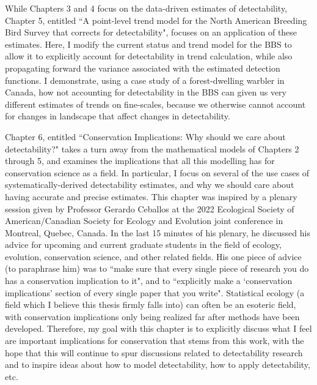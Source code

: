 \par While Chapters 3 and 4 focus on the data-driven estimates of detectability, Chapter 5, entitled ``A point-level trend model for the North American Breeding Bird Survey that corrects for detectability", focuses on an application of these estimates.
Here, I modify the current status and trend model for the BBS \citep{smith_spatially_2023} to allow it to explicitly account for detectability in trend calculation, while also propagating forward the variance associated with the estimated detection functions.
I demonstrate, using a case study of a forest-dwelling warbler in Canada, how not accounting for detectability in the BBS can given us very different estimates of trends on fine-scales, because we otherwise cannot account for changes in landscape that affect changes in detectability.

\par Chapter 6, entitled ``Conservation Implications: Why should we care about detectability?" takes a turn away from the mathematical models of Chapters 2 through 5, and examines the implications that all this modelling has for conservation science as a field.
In particular, I focus on several of the use cases of systematically-derived detectability estimates, and why we should care about having accurate and precise estimates.
This chapter was inspired by a plenary session given by Professor Gerardo Ceballos at the 2022 Ecological Society of American/Canadian Society for Ecology and Evolution joint conference in Montreal, Quebec, Canada.
In the last 15 minutes of his plenary, he discussed his advice for upcoming and current graduate students in the field of ecology, evolution, conservation science, and other related fields.
His one piece of advice (to paraphrase him) was to ``make sure that every single piece of research you do has a conservation implication to it", and to ``explicitly make a `conservation implications' section of every single paper that you write".
Statistical ecology (a field which I believe this thesis firmly falls into) can often be an esoteric field, with conservation implications only being realized far after methods have been developed.
Therefore, my goal with this chapter is to explicitly discuss what I feel are important implications for conservation that stems from this work, with the hope that this will continue to spur discussions related to detectability research and to inspire ideas about how to model detectability, how to apply detectability, etc.

